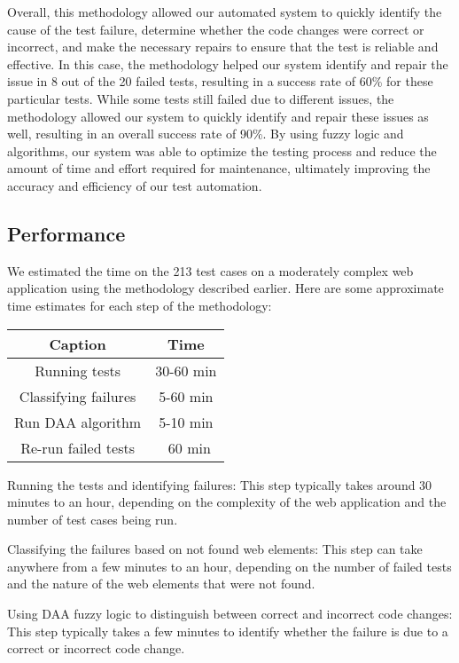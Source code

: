 \documentclass{article}
\begin{document}
Overall, this methodology allowed our automated system to quickly identify the cause of the test failure, determine whether the code changes were correct or incorrect, and make the necessary repairs to ensure that the test is reliable and effective. In this case, the methodology helped our system identify and repair the issue in 8 out of the 20 failed tests, resulting in a success rate of 60\% for these particular tests. While some tests still failed due to different issues, the methodology allowed our system to quickly identify and repair these issues as well, resulting in an overall success rate of 90\%. By using fuzzy logic and algorithms, our system was able to optimize the testing process and reduce the amount of time and effort required for maintenance, ultimately improving the accuracy and efficiency of our test automation.

\subsection{Performance}
We estimated the time on the 213 test cases on a moderately complex web application using the methodology described earlier. Here are some approximate time estimates for each step of the methodology:

\begin{center}
\begin{tabular}{ |c|c| }
    \hline
    Caption & Time \\
    \hline\hline
    Running tests & 30-60 min \\
    \hline
    Classifying failures & 5-60 min \\
    \hline
    Run DAA algorithm & 5-10 min \\
    \hline
    Re-run failed tests & ~60 min \\
    \hline
\end{tabular}
\end{center}

Running the tests and identifying failures: This step typically takes around 30 minutes to an hour, depending on the complexity of the web application and the number of test cases being run.

Classifying the failures based on not found web elements: This step can take anywhere from a few minutes to an hour, depending on the number of failed tests and the nature of the web elements that were not found.

Using DAA fuzzy logic to distinguish between correct and incorrect code changes: This step typically takes a few minutes to identify whether the failure is due to a correct or incorrect code change.
\end{document}
